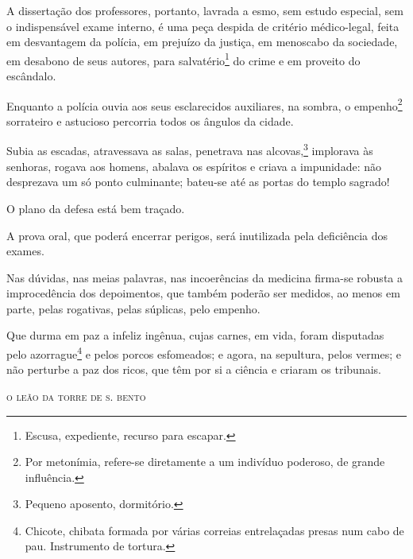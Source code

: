A dissertação dos professores, portanto, lavrada a esmo, sem estudo
especial, sem o indispensável exame interno, é uma peça despida de
critério médico-legal, feita em desvantagem da polícia, em prejuízo da
justiça, em menoscabo da sociedade, em desabono de seus autores, para
salvatério\footnote{Escusa, expediente, recurso para escapar.} do
crime e em proveito do escândalo.

\noindent\dotfill

Enquanto a polícia ouvia aos seus esclarecidos auxiliares, na sombra, o
empenho\footnote{Por metonímia, refere-se diretamente a um indivíduo
  poderoso, de grande influência.} sorrateiro e astucioso percorria
todos os ângulos da cidade.

Subia as escadas, atravessava as salas, penetrava nas alcovas,\footnote{
  Pequeno aposento, dormitório.} implorava às senhoras, rogava aos
homens, abalava os espíritos e criava a impunidade: não desprezava um só
ponto culminante; bateu-se até as portas do templo sagrado!

O plano da defesa está bem traçado.

A prova oral, que poderá encerrar perigos, será inutilizada pela
deficiência dos exames.

Nas dúvidas, nas meias palavras, nas incoerências da medicina firma-se
robusta a improcedência dos depoimentos, que também poderão ser medidos,
ao menos em parte, pelas rogativas, pelas súplicas, pelo empenho.

\noindent\dotfill

Que durma em paz a infeliz ingênua, cujas carnes, em vida, foram
disputadas pelo azorrague\footnote{Chicote, chibata formada por várias
  correias entrelaçadas presas num cabo de pau. Instrumento de tortura.}
e pelos porcos esfomeados;
e agora, na sepultura, pelos vermes; e não perturbe a paz dos ricos, que
têm por si a ciência e criaram os tribunais.

\medskip
\hfill\textsc{o leão da torre de s. bento}



